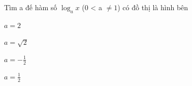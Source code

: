 \begin{question}[type=multiple_choice,difficulty=2,code={I-11}]
Tìm a đế hàm số $ \log_a x $ (0 < a $ \neq 1 $) có đồ thị là hình bên



\begin{choice}[label=A]
$ a=2 $
\end{choice}

\begin{choice}[correct,label=B]
$ a=\sqrt{2} $
\end{choice}

\begin{choice}[label=C]
$ a=-\frac{1}{2} $
\end{choice}

\begin{choice}[label=D]
$ a=\frac{1}{2} $
\end{choice}

\end{question}